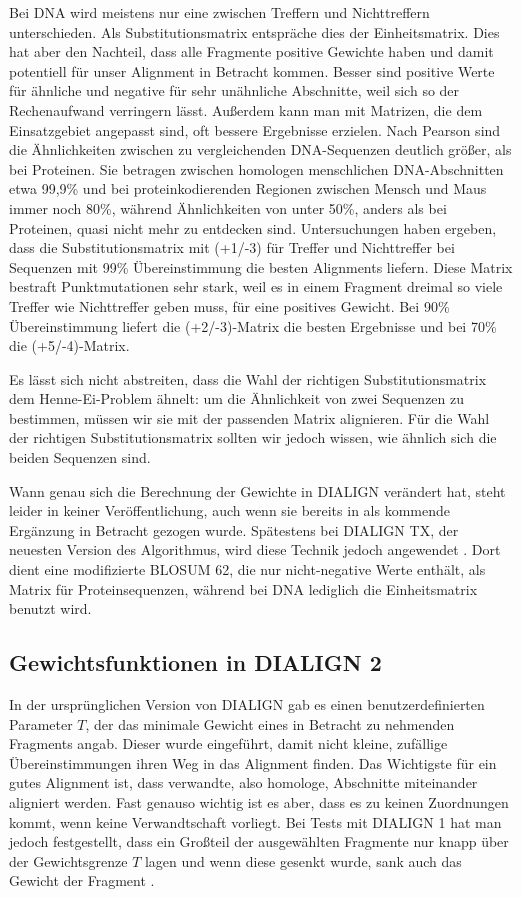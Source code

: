 Bei DNA wird meistens nur eine zwischen Treffern und Nichttreffern unterschieden. Als Substitutionsmatrix entspräche dies der Einheitsmatrix. Dies hat aber den Nachteil, dass alle Fragmente positive Gewichte haben und damit potentiell für unser Alignment in Betracht kommen. Besser sind positive Werte für ähnliche und negative für sehr unähnliche Abschnitte, weil sich so der Rechenaufwand verringern lässt. Außerdem kann man mit Matrizen, die dem Einsatzgebiet angepasst sind, oft bessere Ergebnisse erzielen. Nach Pearson sind die Ähnlichkeiten zwischen zu vergleichenden DNA-Sequenzen deutlich größer, als bei Proteinen\cite{p13}. Sie betragen zwischen homologen menschlichen DNA-Abschnitten etwa 99,9\% und bei proteinkodierenden Regionen zwischen Mensch und Maus immer noch 80\%, während Ähnlichkeiten von unter 50\%, anders als bei Proteinen, quasi nicht mehr zu entdecken sind. Untersuchungen haben ergeben, dass die Substitutionsmatrix mit (+1/-3) für Treffer und Nichttreffer bei Sequenzen mit 99\% Übereinstimmung die besten Alignments liefern. Diese Matrix bestraft Punktmutationen sehr stark, weil es in einem Fragment dreimal so viele Treffer wie Nichttreffer geben muss, für eine positives Gewicht. Bei 90\% Übereinstimmung liefert die (+2/-3)-Matrix die besten Ergebnisse und bei 70\% die (+5/-4)-Matrix.

Es lässt sich nicht abstreiten, dass die Wahl der richtigen Substitutionsmatrix dem Henne-Ei-Problem ähnelt: um die Ähnlichkeit von zwei Sequenzen zu bestimmen, müssen wir sie mit der passenden Matrix alignieren. Für die Wahl der richtigen Substitutionsmatrix sollten wir jedoch wissen, wie ähnlich sich die beiden Sequenzen sind.

Wann genau sich die Berechnung der Gewichte in DIALIGN verändert hat, steht leider in keiner Veröffentlichung, auch wenn sie bereits in \cite{mdw96} als kommende Ergänzung in Betracht gezogen wurde. Spätestens bei DIALIGN TX, der neuesten Version des Algorithmus, wird diese Technik jedoch angewendet \cite{DIALIGNTX}. Dort dient eine modifizierte BLOSUM 62, die nur nicht-negative Werte enthält, als Matrix für Proteinsequenzen, während bei DNA lediglich die Einheitsmatrix benutzt wird.

\subsection{Gewichtsfunktionen in DIALIGN 2} 

In der ursprünglichen Version von DIALIGN gab es einen benutzerdefinierten Parameter $T$, der das minimale Gewicht eines in Betracht zu nehmenden Fragments angab. Dieser wurde eingeführt, damit nicht kleine, zufällige Übereinstimmungen ihren Weg in das Alignment finden. Das Wichtigste für ein gutes Alignment ist, dass verwandte, also homologe, Abschnitte miteinander aligniert werden. Fast genauso wichtig ist es aber, dass es zu keinen Zuordnungen kommt, wenn keine Verwandtschaft vorliegt. Bei Tests mit DIALIGN 1 hat man jedoch festgestellt, dass ein Großteil der ausgewählten Fragmente nur knapp über der Gewichtsgrenze $T$ lagen und wenn diese gesenkt wurde, sank auch das Gewicht der Fragment \cite{mahd98}. 

